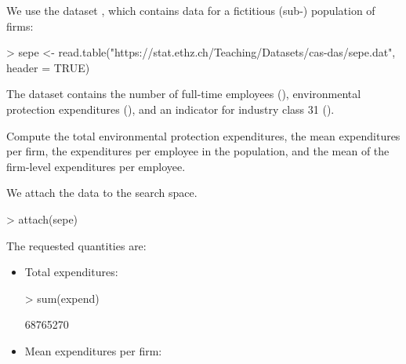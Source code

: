 




\begin{Problem}\label{problem:characteristics}
    We use the dataset , which contains data for a
    fictitious (sub-) population of firms:

\begin{Schunk}
\begin{Sinput}
> sepe <- read.table("https://stat.ethz.ch/Teaching/Datasets/cas-das/sepe.dat",
                     header = TRUE)
\end{Sinput}
\end{Schunk}


    The dataset contains the number of full-time employees (),
    environmental protection expenditures (), and an indicator for
    industry class 31 ().

\begin{Subtask}
    \item Compute the total environmental protection expenditures, the mean
        expenditures per firm, the expenditures per employee in the population,
        and the mean of the firm-level expenditures per employee.

    \begin{Solution}
        We attach the data to the search space.

\begin{Schunk}
\begin{Sinput}
> attach(sepe)
\end{Sinput}
\end{Schunk}

        The requested quantities are:

        \begin{itemize}
            \item Total expenditures:

\begin{Schunk}
\begin{Sinput}
> sum(expend)
\end{Sinput}
\begin{Soutput}
[1] 68765270
\end{Soutput}
\end{Schunk}

            \item Mean expenditures per firm:


\end{itemize}
\end{Solution}
\end{Subtask}
\end{Problem}
